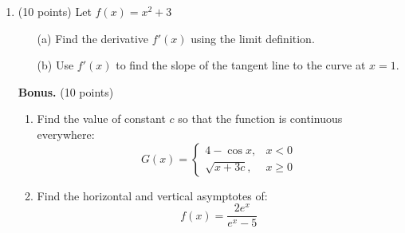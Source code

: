 \documentclass[12pt]{article}
\begin{document}
\begin{enumerate}
    \item (10 points) Let \( f(x) = x^2 + 3 \)
    \begin{enumerate}
        \item [(a)] Find the derivative \( f'(x) \) using the limit definition.
        \item [(b)] Use \( f'(x) \) to find the slope of the tangent line to the curve at \( x = 1 \).
    \end{enumerate}

    \item[\textbf{Bonus.}] (10 points)
    \begin{enumerate}
        \item Find the value of constant \( c \) so that the function is continuous everywhere:
        \[
        G(x) = 
        \begin{cases}
            4 - \cos x, & x < 0 \\
            \sqrt{x + 3c}, & x \geq 0
        \end{cases}
        \]

        \item Find the horizontal and vertical asymptotes of:
        \[
        f(x) = \frac{2e^x}{e^x - 5}
        \]
    \end{enumerate}
\end{enumerate}
\end{document}
